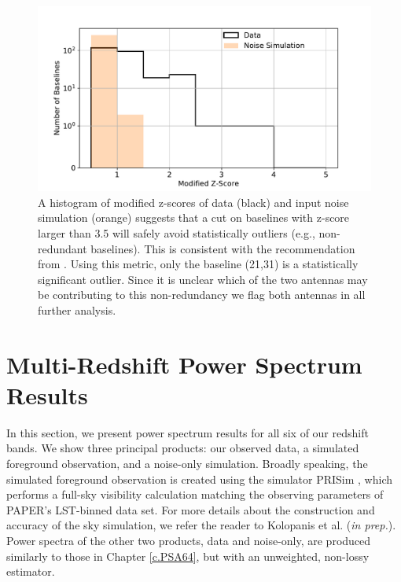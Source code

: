 \begin{figure}[tp]
	\centering
	\includegraphics[width=.85\textwidth]{plots/zscore_hist.pdf}
	\caption{A histogram of modified z-scores of data (black) 
		and input noise simulation (orange) suggests that a cut on baselines
		with z-score larger than 3.5 will safely avoid statistically outliers (e.g., non-redundant baselines). This is consistent with the
		recommendation from \cite{Iglewicz_and_hoaglin}. Using this metric,
		only the baseline (21,31) is a statistically significant outlier. Since it is unclear which of the two antennas may be contributing to this non-redundancy we flag both antennas in all further analysis.} %
\label{fig:mod_z_score_avg}
\end{figure}

\section{Multi-Redshift Power Spectrum Results}\label{sec:pspec_results}

In this section, we present power spectrum results for all six of our redshift bands. We show three principal products: our observed data, a simulated foreground observation, and a noise-only simulation. Broadly speaking, the simulated foreground observation is created using the simulator PRISim \citep{Thyagarajan_et_al2015a, Thyagarajan_et_al2015b}, which performs a full-sky visibility calculation matching the observing parameters of PAPER's LST-binned data set. For more details about the construction and accuracy of the sky simulation, we refer the reader to Kolopanis et al. (\textit{in prep.}). Power spectra of the other two products, data and noise-only, are produced similarly to those in Chapter \ref{c.PSA64}, but with an unweighted, non-lossy estimator.

